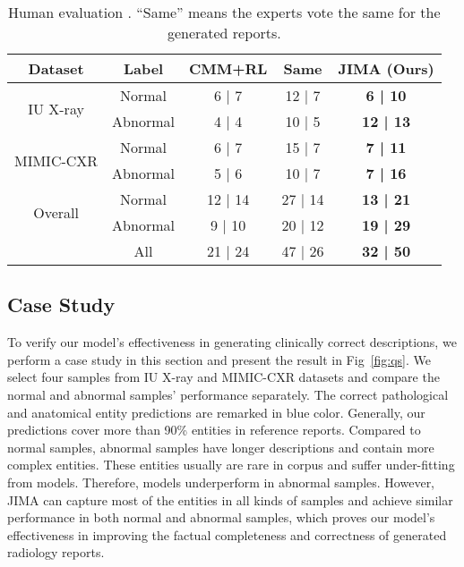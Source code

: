 \documentclass[sn-mathphys-num]{sn-jnl}%
\theoremstyle{thmstyleone}%
\theoremstyle{thmstyletwo}%
\theoremstyle{thmstylethree}%
\begin{document}
\begin{table*}[htp]
\centering
\caption{Human evaluation . ``Same'' means the experts vote the same for the generated reports.}
    \begin{tabular}{c|c|c|c|c} 
        Dataset & Label & CMM+RL & Same & JIMA (Ours) \\ \hline \hline 
        \multirow{2}{*}{IU X-ray} &Normal &6 | 7 &12 | 7 &\textbf{6 | 10}\\
        & Abnormal &4 | 4 &10 | 5 &\textbf{12 | 13}\\ \hline
        \multirow{2}{*}{MIMIC-CXR} & Normal  &6 | 7 &15 | 7  & \textbf{7 | 11}\\
        & Abnormal &5 | 6 &10 | 7& \textbf{7 | 16}\\ \hline
        \multirow{2}{*}{Overall} & Normal &12 | 14 & 27 | 14 &\textbf{13 | 21} \\ 
        & Abnormal &9 | 10 &20 | 12 &\textbf{19 | 29}\\
        & All & 21 | 24 & 47 | 26 &\textbf{32 | 50}\\ 
    \end{tabular}
\label{tab:human_eval}
\end{table*}

\subsection{Case Study}
\label{subsec:case_study}

To verify our model's effectiveness in generating clinically correct descriptions, we perform a case study in this section and present the result in Fig~\ref{fig:qs}. We select four samples from IU X-ray and MIMIC-CXR datasets and compare the normal and abnormal samples' performance separately. The correct pathological and anatomical entity predictions are remarked in blue color. Generally, our predictions cover more than 90\% entities in reference reports. Compared to normal samples, abnormal samples have longer descriptions and contain more complex entities. These entities usually are rare in corpus and suffer under-fitting from models. Therefore, models underperform in abnormal samples. 
However, JIMA can capture most of the entities in all kinds of samples and achieve similar performance in both normal and abnormal samples, which proves our model's effectiveness in improving the factual completeness and correctness of generated radiology reports.
\end{document}

